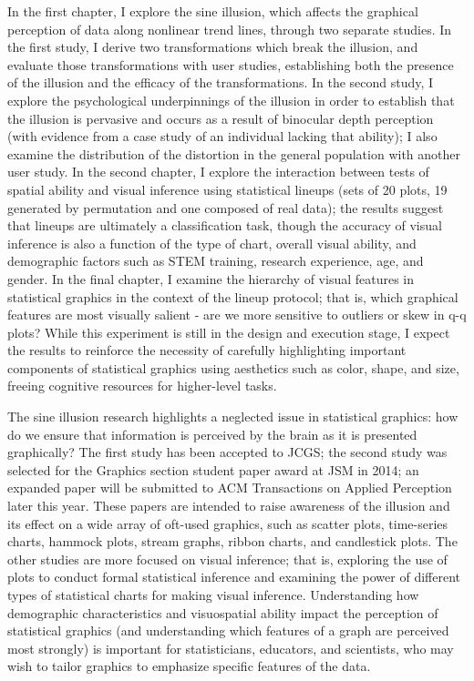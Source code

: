 \documentclass[11pt,letterpaper,sans,unicode]{moderncv}        %
\begin{document}
In the first chapter, I explore the sine illusion, which affects the graphical perception of data along nonlinear trend lines, through two separate studies. In the first study, I derive two transformations which break the illusion, and evaluate those transformations with user studies, establishing both the presence of the illusion and the efficacy of the transformations. In the second study, I explore the psychological underpinnings of the illusion in order to establish that the illusion is pervasive and occurs as a result of binocular depth perception (with evidence from a case study of an individual lacking that ability); I also examine the distribution of the distortion in the general population with another user study. 
In the second chapter, I explore the interaction between tests of spatial ability and visual inference using statistical lineups (sets of 20 plots, 19 generated by permutation and one composed of real data); the results suggest that lineups are ultimately a classification task, though the accuracy of visual inference is also a function of the type of chart, overall visual ability, and demographic factors such as STEM training, research experience, age, and gender. 
In the final chapter, I examine the hierarchy of visual features in statistical graphics in the context of the lineup protocol; that is, which graphical features are most visually salient - are we more sensitive to outliers or skew in q-q plots? While this experiment is still in the design and execution stage, I expect the results to reinforce the necessity of carefully highlighting important components of statistical graphics using aesthetics such as color, shape, and size, freeing cognitive resources for higher-level tasks. 

\vspace{.325cm}The sine illusion research highlights a neglected issue in statistical graphics: how do we ensure that information is perceived by the brain as it is presented graphically? The first study has been accepted to JCGS; the second study was selected for the Graphics section student paper award at JSM in 2014; an expanded paper will be submitted to ACM Transactions on Applied Perception later this year. These papers are intended to raise awareness of the illusion and its effect on a wide array of oft-used graphics, such as scatter plots, time-series charts, hammock plots, stream graphs, ribbon charts, and candlestick plots. The other studies are more focused on visual inference; that is, exploring the use of plots to conduct formal statistical inference and examining the power of different types of statistical charts for making visual inference. Understanding how demographic characteristics and visuospatial ability impact the perception of statistical graphics (and understanding which features of a graph are perceived most strongly) is important for statisticians, educators, and scientists, who may wish to tailor graphics to emphasize specific features of the data.
\end{document}
